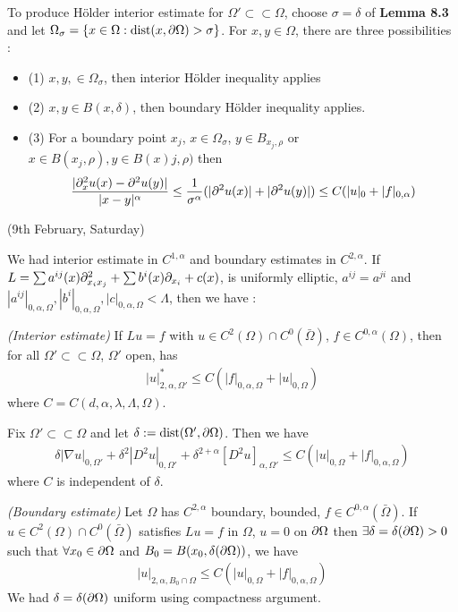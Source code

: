 \documentclass[12pt,a4paper]{article}
\renewenvironment{i}
{\begin{itemize} 
	}%
	{\end{itemize}
}
\begin{document}
To produce H\"older interior estimate for $\Omega' \subset\subset \Omega$, choose $\sigma = \delta$ of \textbf{Lemma 8.3}  and let $\Omega_{\sigma} = \{x\in \Omega : \text{dist}(x, \partial \Omega)>\sigma\}$. For $x, y\in \Omega$, there are three possibilities :
\begin{i}
\item[(1)] $x,y,\in \Omega_{\sigma}$, then interior H\"older inequality applies
\item[(2)] $x,y\in B(x,\delta)$, then boundary H\"older inequality applies.
\item[(3)] For a boundary point $x_j$, $x\in \Omega_{\sigma}$, $y\in B_{x_j, \rho}$ or $x\in B(x_j, \rho), y\in B(x)j, \rho)$ then
\begin{align*}
\frac{|\partial_x^2 u(x) - \partial^2_{}u(y)|}{|x-y|^{\alpha}} \leq \frac{1}{\sigma^{\alpha}}(|\partial^2 u(x)|+ |\partial^2 u(y)|) \leq C(|u|_0 + |f|_{0, \alpha})
\end{align*} 
\end{i}
\s

\newday

(9th February, Saturday)
\s

We had interior estimate in $C^{1, \alpha}$ and boundary estimates in $C^{2, \alpha}$. If $L = \sum a^{ij}(x) \partial^2_{x_i x_j} + \sum b^i(x) \partial_{x_i} + c(x)$, is uniformly elliptic, $a^{ij} =a^{ji}$ and $|a^{ij}|_{0, \alpha, \Omega}, |b^i|_{0, \alpha, \Omega}, |c|_{0, \alpha, \Omega}< \Lambda$, then we have :
\s

 \emph{(Interior estimate)} If $Lu =f$ with $u\in C^2(\Omega)\cap C^0 (\bar{\Omega})$, $f\in C^{0, \alpha}(\Omega)$, then for all $\Omega'\subset \subset \Omega$, $\Omega'$ open, has
\begin{align*}
|u|^*_{2, \alpha, \Omega'} \leq C(|f|_{0, \alpha, \Omega} + |u|_{0, \Omega})
\end{align*}
where $C =C(d, \alpha, \lambda, \Lambda, \Omega)$.
\s

\corr Fix $\Omega'\subset\subset \Omega$ and let $\delta := \text{dist}(\Omega', \partial \Omega)$. Then we have
\begin{align*}
\delta|\nabla u|_{0, \Omega'} + \delta^2 |D^2 u|_{0, \Omega'} + \delta^{2+ \alpha}[D^2 u]_{\alpha, \Omega'} \leq C (|u|_{0, \Omega} + |f|_{0, \alpha, \Omega})
\end{align*}
where $C$ is independent of $\delta$.
\s

 \emph{(Boundary estimate)} Let $\Omega$ has $C^{2, \alpha}$ boundary, bounded, $f\in C^{0, \alpha}(\bar{\Omega})$. If $u\in C^{2}(\Omega) \cap C^0(\bar{\Omega})$ satisfies $Lu =f$ in $\Omega$, $u= 0$ on $\partial \Omega$ then $\exists\delta = \delta(\partial \Omega) >0$ such that $\forall x_0 \in \partial \Omega$ and $B_0 = B(x_0, \delta(\partial \Omega))$, we have
\begin{align*}
|u|_{2, \alpha, B_0 \cap \Omega} \leq C(|u|_{0, \Omega} + |f|_{0, \alpha, \Omega})
\end{align*}
We had $\delta = \delta(\partial \Omega)$ uniform using compactness argument.
\s
\end{document}
